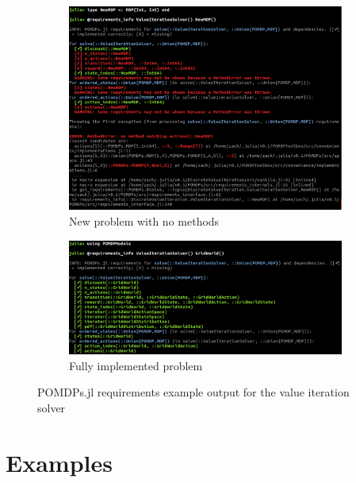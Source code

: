 \begin{figure}[htpb]
    \centering
    \begin{subfigure}[b]{0.48\textwidth}
    \begin{center}
        \includegraphics[width=\textwidth]{media/requirements_info_new.png}
    \end{center}
    \caption{New problem with no methods}
    \end{subfigure}
    \hfill
    \begin{subfigure}[b]{0.48\textwidth}
    \begin{center}
        \includegraphics[width=\textwidth]{media/requirements_info_gw.png}
    \end{center}
    \caption{Fully implemented problem}
    \end{subfigure}
     
    \caption[POMDPs.jl requirements example]{POMDPs.jl requirements example output for the value iteration solver}
    \label{fig:requirements}
\end{figure}

\section{Examples}

